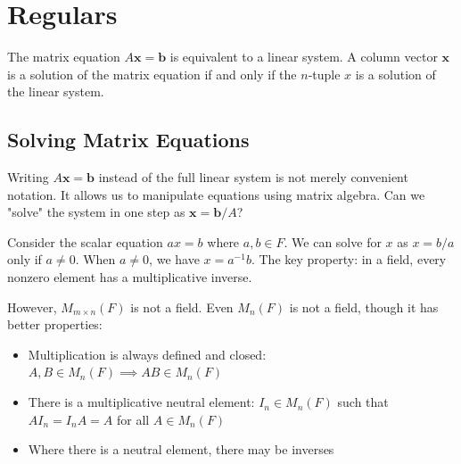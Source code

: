 \section{Regulars}
\begin{note}
    The matrix equation $A\mathbf{x} = \mathbf{b}$ is equivalent to a linear system. A column vector $\mathbf{x}$ is a solution of the matrix equation if and only if the $n$-tuple $x$ is a solution of the linear system.
\end{note}

\subsection{Solving Matrix Equations}

\begin{note}
    Writing $A\mathbf{x} = \mathbf{b}$ instead of the full linear system is not merely convenient notation. It allows us to manipulate equations using matrix algebra. Can we "solve" the system in one step as $\mathbf{x} = \mathbf{b}/A$?
\end{note}

\begin{note}
    Consider the scalar equation $ax = b$ where $a, b \in F$. We can solve for $x$ as $x = b/a$ only if $a \neq 0$. When $a \neq 0$, we have $x = a^{-1}b$. The key property: in a field, every nonzero element has a multiplicative inverse.
\end{note}

\begin{note}
    However, $M_{m \times n}(F)$ is not a field. Even $M_n(F)$ is not a field, though it has better properties:
    \begin{itemize}
        \item Multiplication is always defined and closed: $A, B \in M_n(F) \implies AB \in M_n(F)$
        \item There is a multiplicative neutral element: $I_n \in M_n(F)$ such that $AI_n = I_nA = A$ for all $A \in M_n(F)$
        \item Where there is a neutral element, there may be inverses
    \end{itemize}
\end{note}

